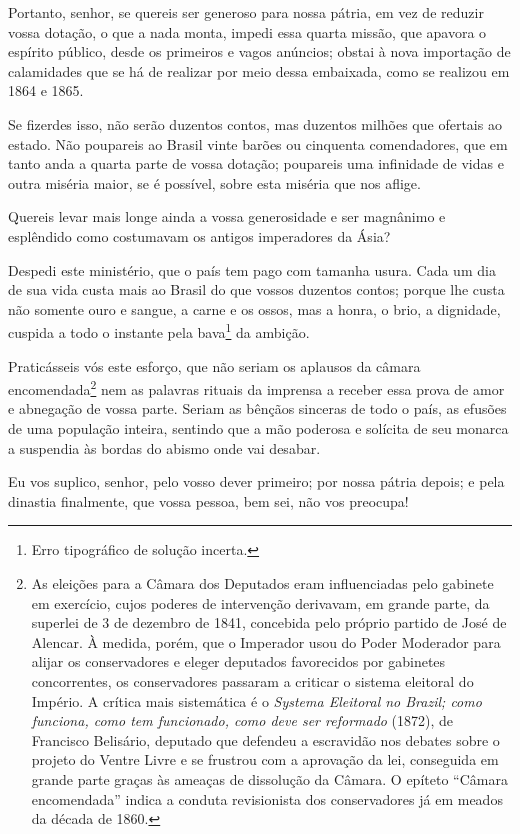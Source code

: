 \begin{linenumbers}
 Portanto, senhor, se quereis ser generoso para nossa pátria, em vez de
reduzir vossa dotação, o que a nada monta, impedi essa quarta missão,
que apavora o espírito público, desde os primeiros e vagos anúncios;
obstai à nova importação de calamidades que se há de realizar por meio
dessa embaixada, como se realizou em 1864 e 1865. 

 Se fizerdes isso, não serão duzentos contos, mas duzentos milhões que
ofertais ao estado. Não poupareis ao Brasil vinte barões ou cinquenta
comendadores, que em tanto anda a quarta parte de vossa dotação;
poupareis uma infinidade de vidas e outra miséria maior, se é possível,
sobre esta miséria que nos aflige. 

 Quereis levar mais longe ainda a vossa generosidade e ser magnânimo e
esplêndido como costumavam os antigos imperadores da Ásia? 

 Despedi este ministério, que o país tem pago com tamanha usura. Cada um
dia de sua vida custa mais ao Brasil do que vossos duzentos contos;
porque lhe custa não somente ouro e sangue, a carne e os ossos, mas a
honra, o brio, a dignidade, cuspida a todo o instante pela
bava\footnote{ Erro tipográfico de solução incerta.} da ambição. 

 Praticásseis vós este esforço, que não seriam os aplausos da câmara
encomendada\footnote{ As eleições para a Câmara dos Deputados eram influenciadas pelo gabinete
em exercício, cujos poderes de intervenção derivavam, em grande parte,
da superlei de 3 de dezembro de 1841, concebida pelo próprio partido de
José de Alencar. À medida, porém, que o Imperador usou do Poder
Moderador para alijar os conservadores e eleger deputados favorecidos
por gabinetes concorrentes, os conservadores passaram a criticar o
sistema eleitoral do Império. A crítica mais sistemática é o
\textit{Systema Eleitoral no Brazil; como funciona, como tem
funcionado, como deve ser reformado} (1872), de Francisco Belisário,
deputado que defendeu a escravidão nos debates sobre o projeto do
Ventre Livre e se frustrou com a aprovação da lei, conseguida em grande
parte graças às ameaças de dissolução da Câmara. O epíteto ``Câmara
encomendada'' indica a conduta revisionista dos conservadores já em
meados da década de 1860.} nem as palavras rituais da imprensa a receber essa prova de amor e
abnegação de vossa parte. Seriam as bênçãos sinceras de todo o país, as
efusões de uma população inteira, sentindo que a mão poderosa e
solícita de seu monarca a suspendia às bordas do abismo onde vai desabar. 

 Eu vos suplico, senhor, pelo vosso dever primeiro; por nossa pátria
depois; e pela dinastia finalmente, que vossa pessoa, bem sei, não vos preocupa!


\end{linenumbers}
